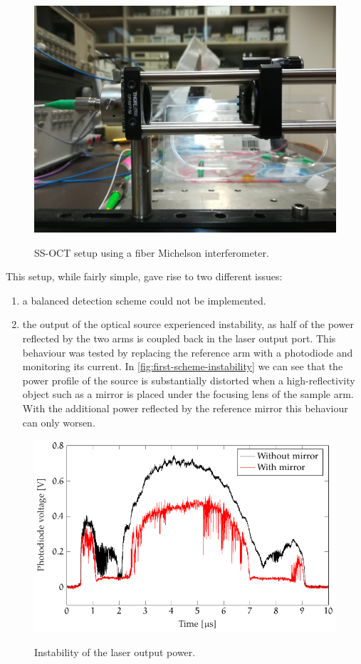 \begin{figure}[bth]
	\myfloatalign
	{\includegraphics[width=0.6\linewidth]{gfx/ch3/reference-arm-photo}}
	\caption{SS-OCT setup using a fiber Michelson interferometer.}\label{fig:reference-arm-photo}
\end{figure}

This setup, while fairly simple, gave rise to two different issues:
\begin{enumerate}
	\item a balanced detection scheme could not be implemented.
	
	\item the output of the optical source experienced instability, as half of the power reflected by the two arms is coupled back in the laser output port. This behaviour was tested by replacing the reference arm with a photodiode and monitoring its current. In \autoref{fig:first-scheme-instability} we can see that the power profile of the source is substantially distorted when a high-reflectivity object such as a mirror is placed under the focusing lens of the sample arm. With the additional power reflected by the reference mirror this behaviour can only worsen. 
	
	
\end{enumerate}
\begin{figure}[bth]
	\myfloatalign
	{\includegraphics[width=0.8\linewidth]{gfx/ch3/first-scheme-instability}}
	\caption{Instability of the laser output power.}\label{fig:first-scheme-instability}
\end{figure}





